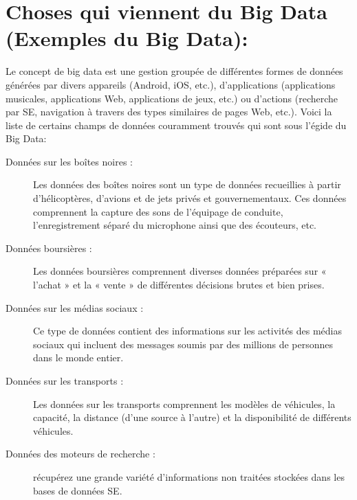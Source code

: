 \section{Choses qui viennent du Big Data (Exemples du Big Data):}
Le concept de big data est une gestion groupée de différentes formes de données générées par divers appareils (Android, iOS, etc.), d'applications (applications musicales, applications Web, applications de jeux, etc.) ou d'actions (recherche par SE, navigation à travers des types similaires de pages Web, etc.). Voici la liste de certains champs de données couramment trouvés qui sont sous l'égide du Big Data:

\begin{description}
\item[Données sur les boîtes noires :]
Les données des boîtes noires sont un type de données recueillies à partir d'hélicoptères, d'avions et de jets privés et gouvernementaux. Ces données comprennent la capture des sons de l'équipage de conduite, l'enregistrement séparé du microphone ainsi que des écouteurs, etc.
\item[Données boursières :]
Les données boursières comprennent diverses données préparées sur « l'achat » et la « vente » de différentes décisions brutes et bien prises.
\item[Données sur les médias sociaux :] 
Ce type de données contient des informations sur les activités des médias sociaux qui incluent des messages soumis par des millions de personnes dans le monde entier.
\item[Données sur les transports :] 
Les données sur les transports comprennent les modèles de véhicules, la capacité, la distance (d'une source à l'autre) et la disponibilité de différents véhicules.
\item[Données des moteurs de recherche :] 
récupérez une grande variété d'informations non traitées stockées dans les bases de données SE.

\end{description}